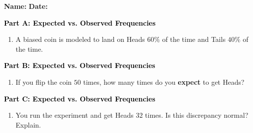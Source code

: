 \documentclass[12pt, letterpaper, fleqn]{article}
\newcommand{\blank}{\underline{\hspace{2.2cm}}}
\newcommand{\blanklong}{\underline{\hspace{6.5cm}}}
\begin{document}
\textbf{Name:} \underline{\hspace{5cm}}
\hfill
\textbf{Date:} \underline{\hspace{3cm}}\\

\begin{tcolorbox}[colback=customteal!20]
\large\textcolor{black}{\textbf{Part A: Expected vs. Observed Frequencies}}
\end{tcolorbox}

\vspace{3mm}

\begin{enumerate}[itemsep=4.2cm, leftmargin=0.6cm]
\item A biased coin is modeled to land on Heads $60\%$ of the time and Tails $40\%$ of the time. 
\end{enumerate}

\newpage

\begin{tcolorbox}[colback=customteal!20]
\large\textcolor{black}{\textbf{Part B: Expected vs. Observed Frequencies}}
\end{tcolorbox}

\vspace{3mm}

\begin{enumerate}[itemsep=4.2cm, leftmargin=0.6cm, resume]
\item If you flip the coin $50$ times, how many times do you \textbf{expect} to get Heads? \blank
\end{enumerate}

\newpage

\begin{tcolorbox}[colback=customteal!20]
\large\textcolor{black}{\textbf{Part C: Expected vs. Observed Frequencies}}
\end{tcolorbox}

\vspace{3mm}

\begin{enumerate}[itemsep=4.2cm, leftmargin=0.6cm, resume]
\item You run the experiment and get Heads $32$ times. Is this discrepancy normal? Explain. \blanklong
\end{enumerate}

\newpage
\end{document}
